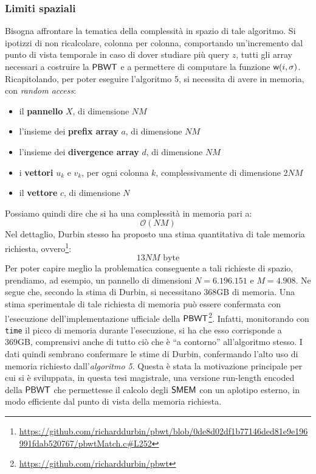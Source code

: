 \subsubsection{Limiti spaziali}
Bisogna affrontare la tematica della complessità in spazio di tale
algoritmo. Si ipotizzi di non ricalcolare, colonna per colonna, comportando
un'incremento dal punto di vista temporale in caso di dover studiare più query
$z$, tutti gli array  
necessari a costruire la $\mbox{\rm {\sf PBWT}}$ e a permettere di computare la funzione
$\mbox{\rm {\sf w}}(i,\sigma)$.\\
Ricapitolando, per poter eseguire l'algoritmo 5, si necessita di avere in
memoria, con \textit{random access}:
\begin{itemize}
  \item il \textbf{pannello} $X$, di dimensione $NM$
  \item l'insieme dei \textbf{prefix array} $a$, di dimensione $NM$
  \item l'insieme dei \textbf{divergence array} $d$, di dimensione $NM$
  \item i \textbf{vettori} $u_k$ e $v_k$, per ogni colonna $k$, complessivamente
  di dimensione $2NM$ 
  \item il \textbf{vettore} $c$, di dimensione $N$
\end{itemize}
Possiamo quindi dire che si ha una complessità in memoria pari a:
\begin{equation}
  \label{eq:pbwtsize}
  \mathcal{O}(NM)
\end{equation}
Nel dettaglio, Durbin stesso ha proposto una stima quantitativa di tale memoria
richiesta,
ovvero\footnote{\scriptsize{\url{https://github.com/richarddurbin/pbwt/blob/0de8d02df1b77146ded81e9e196991fdab520767/pbwtMatch.c\#L252}}}:
\begin{equation}
  \label{eq:pbwtsize2}
  13NM\mbox{ byte}
\end{equation}
Per poter capire meglio la problematica conseguente a tali richieste di spazio,
prendiamo, ad esempio, un pannello di 
dimensioni $N= 6.196.151$ e $M=4.908$. Ne segue che, secondo la stima
di 
Durbin, si necessitano 368GB di memoria. Una stima
sperimentale di tale richiesta di memoria può essere confermata con l'esecuzione
dell'implementazione ufficiale della
$\mbox{\rm {\sf PBWT}}$\footnote{\url{https://github.com/richarddurbin/pbwt}}. Infatti,
monitorando  
con \texttt{time} il picco di memoria durante l'esecuzione, si ha che esso
corrisponde a 369GB, comprensivi anche di tutto ciò che è ``a
contorno'' all'algoritmo stesso. I dati quindi sembrano confermare le stime di
Durbin, confermando l'alto uso di memoria richiesto dall'\textit{algoritmo
  5}. Questa è 
stata la motivazione principale per cui si è sviluppata, in questa tesi
magistrale, una versione run-length encoded della $\mbox{\rm {\sf PBWT}}$ che permettesse il
calcolo degli $\mbox{\rm {\sf SMEM}}$ con un aplotipo esterno, in modo efficiente dal punto di
vista della memoria richiesta.
